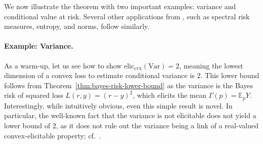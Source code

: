 \documentclass[anon,12pt]{colt2021} %
\newcommand{\reals}{\mathbb{R}}
\newcommand{\prop}[2][\mathcal{P}]{\mathrm{prop}_{#1}[#2]}
\newcommand{\eliccvx}{\mathrm{elic}_\mathrm{cvx}}
\newcommand{\affhull}{\mathrm{affhull}}
\newcommand{\E}{\mathbb{E}}
\newcommand{\Y}{\mathcal{Y}}
\newcommand{\lbar}{\underline{L}} %
\newcommand{\Var}{\mathrm{Var}}
\begin{document}

We now illustrate the theorem with two important examples: variance and conditional value at risk.
Several other applications from \citet{frongillo2020elicitation}, such as spectral risk measures, entropy, and norms, follow similarly.

\paragraph{Example: Variance.}
As a warm-up, let us see how to show $\eliccvx(\Var)=2$, meaning the lowest dimension of a convex loss to estimate conditional variance is 2. %
This lower bound follows from Theorem~\ref{thm:bayes-risk-lower-bound} as the variance is the Bayes risk of squared loss $L(r,y) = (r-y)^2$, which elicits the mean $\Gamma(p) = \E_p Y$.
Interestingly, while intuitively obvious, even this simple result is novel.
In particular, the well-known fact that the variance is not elicitable does not yield a lower bound of 2, as it does not rule out the variance being a link of a real-valued convex-elicitable property; cf.~\citet[Remark 1]{frongillo2020elicitation}.
\end{document}
